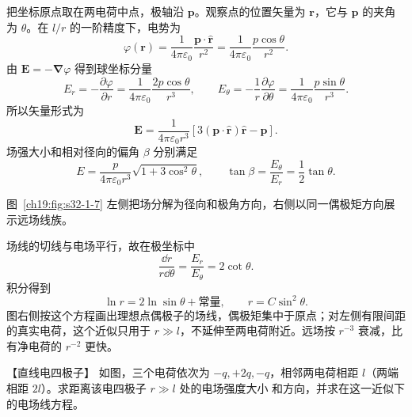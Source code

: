 \begin{xesolution}
把坐标原点取在两电荷中点，极轴沿 $\boldsymbol p$。观察点的位置矢量为 $\boldsymbol r$，它与
$\boldsymbol p$ 的夹角为 $\theta$。在 $l/r$ 的一阶精度下，电势为
\[
  \varphi(\boldsymbol r)
  =\frac{1}{4\pi\varepsilon_0}\frac{\boldsymbol p\cdot\hat{\boldsymbol r}}{r^2}
  =\frac{1}{4\pi\varepsilon_0}\frac{p\cos\theta}{r^2}.
\]
由 $\boldsymbol E=-\boldsymbol\nabla\varphi$ 得到球坐标分量
\[
  E_r=-\frac{\partial\varphi}{\partial r}
  =\frac{1}{4\pi\varepsilon_0}\frac{2p\cos\theta}{r^3},
  \qquad
  E_\theta=-\frac1r\frac{\partial\varphi}{\partial\theta}
  =\frac{1}{4\pi\varepsilon_0}\frac{p\sin\theta}{r^3}.
\]
所以矢量形式为
\[
  \boxed{\boldsymbol E
  =\frac{1}{4\pi\varepsilon_0r^3}
  \left[3(\boldsymbol p\cdot\hat{\boldsymbol r})\hat{\boldsymbol r}-\boldsymbol p\right]}.
\]
场强大小和相对径向的偏角 $\beta$ 分别满足
\[
  \boxed{E=\frac{p}{4\pi\varepsilon_0r^3}\sqrt{1+3\cos^2\theta}},
  \qquad
  \tan\beta=\frac{E_\theta}{E_r}=\frac12\tan\theta.
\]

图~\ref{ch19:fig:s32-1-7} 左侧把场分解为径向和极角方向，右侧以同一偶极矩方向展示远场线族。

\par\noindent\begin{minipage}{\linewidth}
\ThDipoleAnalysisDrawing
{}\label{ch19:fig:s32-1-7}
\end{minipage}\par\medskip

场线的切线与电场平行，故在极坐标中
\[
  \frac{\dd r}{r\dd\theta}=\frac{E_r}{E_\theta}=2\cot\theta.
\]
积分得到
\[
  \ln r=2\ln\sin\theta+\text{常量},
  \qquad
  \boxed{r=C\sin^2\theta}.
\]
图右侧按这个方程画出理想点偶极子的场线，偶极矩集中于原点；对左侧有限间距的真实电荷，这个近似只用于 $r\gg l$，不延伸至两电荷附近。远场按 $r^{-3}$ 衰减，比有净电荷的
$r^{-2}$ 更快。
\end{xesolution}
\begin{origexamplebox}{【直线电四极子】}\label{ch19:ex:s32-1-5}
如图，三个电荷依次为 $-q,+2q,-q$，相邻两电荷相距 $l$（两端相距 $2l$）。求距离该电四极子 $r\gg l$ 处的电场强度大小
和方向，并求在这一近似下的电场线方程。
\par\noindent\begin{minipage}{\linewidth}
\emQuadrupoleQuestion
{}\label{ch19:fig:em-question-5}
\end{minipage}\par\medskip
\end{origexamplebox}\par\nopagebreak[4]

